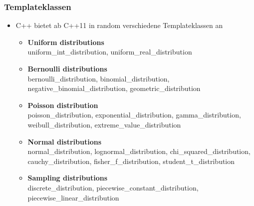 \subsubsection{Templateklassen}
\begin{itemize}
	\item C++ bietet ab C++11 in \<random\> verschiedene Templateklassen an
	\begin{itemize}
		\item \textbf{Uniform distributions}\\ uniform\_int\_distribution, uniform\_real\_distribution
		\item \textbf{Bernoulli distributions}\\ bernoulli\_distribution, binomial\_distribution, negative\_binomial\_distribution, geometric\_distribution
		\item \textbf{Poisson distribution}\\ poisson\_distribution, exponential\_distribution, gamma\_distribution, weibull\_distribution, extreme\_value\_distribution
		\item \textbf{Normal distributions}\\ normal\_distribution, lognormal\_distribution, chi\_squared\_distribution, cauchy\_distribution, fisher\_f\_distribution, student\_t\_distribution
		\item \textbf{Sampling distributions}\\ discrete\_distribution, piecewise\_constant\_distribution, piecewise\_linear\_distribution
	\end{itemize}
\end{itemize}
